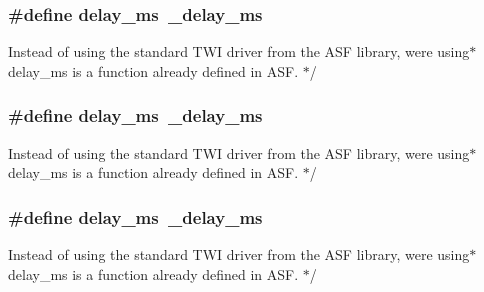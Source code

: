 \subsubsection[{\texorpdfstring{delay\+\_\+ms}{delay_ms}}]{\setlength{\rightskip}{0pt plus 5cm}\#define delay\+\_\+ms~\+\_\+delay\+\_\+ms}\hypertarget{group___d_r_i_v_e_r_s_gae36aca5baf9b6b7d74992aef00686d67}{}\label{group___d_r_i_v_e_r_s_gae36aca5baf9b6b7d74992aef00686d67}

\begin{DoxyItemize}
\item Instead of using the standard T\+WI driver from the A\+SF library, we\textquotesingle{}re using$\ast$ delay\+\_\+ms is a function already defined in A\+SF. $\ast$/ 
\end{DoxyItemize}
\subsubsection[{\texorpdfstring{delay\+\_\+ms}{delay_ms}}]{\setlength{\rightskip}{0pt plus 5cm}\#define delay\+\_\+ms~\+\_\+delay\+\_\+ms}\hypertarget{group___d_r_i_v_e_r_s_gae36aca5baf9b6b7d74992aef00686d67}{}\label{group___d_r_i_v_e_r_s_gae36aca5baf9b6b7d74992aef00686d67}

\begin{DoxyItemize}
\item Instead of using the standard T\+WI driver from the A\+SF library, we\textquotesingle{}re using$\ast$ delay\+\_\+ms is a function already defined in A\+SF. $\ast$/ 
\end{DoxyItemize}
\subsubsection[{\texorpdfstring{delay\+\_\+ms}{delay_ms}}]{\setlength{\rightskip}{0pt plus 5cm}\#define delay\+\_\+ms~\+\_\+delay\+\_\+ms}\hypertarget{group___d_r_i_v_e_r_s_gae36aca5baf9b6b7d74992aef00686d67}{}\label{group___d_r_i_v_e_r_s_gae36aca5baf9b6b7d74992aef00686d67}

\begin{DoxyItemize}
\item Instead of using the standard T\+WI driver from the A\+SF library, we\textquotesingle{}re using$\ast$ delay\+\_\+ms is a function already defined in A\+SF. $\ast$/ 
\end{DoxyItemize}
